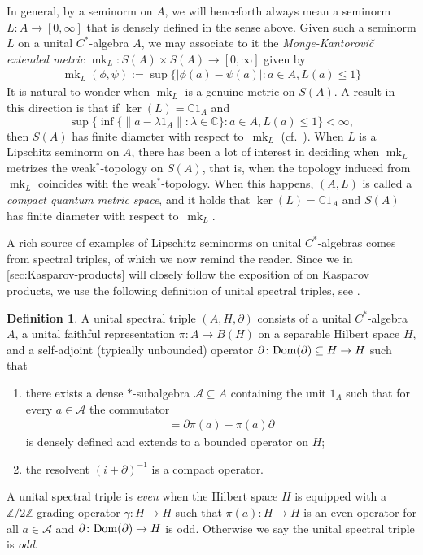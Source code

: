 \documentclass[11pt, a4paper, oneside, final, reqno]{amsart}
\newcommand{\calA}{\mathcal{A}}
\newcommand{\bbZ}{\mathbb{Z}}
\newcommand{\bbC}{\mathbb{C}}
\newcommand{\mk}{\operatorname{mk}}
\theoremstyle{definition}
\newtheorem{definition}{Definition}[section]
\theoremstyle{plain}
\theoremstyle{remark}
\numberwithin{equation}{section}
\begin{document}
In general, by a seminorm on $A$, we will henceforth always mean a seminorm $L \colon A \to [0, \infty]$ that is densely defined in the sense above. Given such a seminorm $L$ on a unital $C^*$-algebra $A$, we may associate to it the \emph{Monge-Kantorovi\v{c} extended metric} $\mk_L \colon S(A) \times S(A) \to [0,\infty]$ given by
\begin{align}\label{eq:def-mk-metric}
    \mk_L (\phi, \psi) := \sup \{ \vert \phi(a) - \psi(a) \vert : a\in A, L(a) \leq 1 \}
\end{align}
It is natural to wonder when $\mk_L$ is a genuine metric on $S(A)$. A result in this direction is that if $\ker(L) = \bbC 1_A$ and 
\begin{equation*}
    \sup\big\{\inf\{\|a-\lambda 1_A\|: \lambda \in \bbC\} : a\in A, L(a)\leq 1\big\} <\infty,
\end{equation*}
then $S(A)$ has finite diameter with respect to~$\mk_L$ (cf.~\cite[Proposition 1.6]{Rieffel98}). When $L$ is a Lipschitz seminorm on $A$, there has been a lot of interest in deciding when $\mk_L$ metrizes the weak$^*$-topology on $S(A)$, that is, when the topology induced from $\mk_L$ coincides with the weak$^*$-topology. When this happens, $(A, L)$ is called a \emph{compact quantum metric space}, and it holds that $\ker(L) = \bbC 1_A$ and $S(A)$ has finite diameter with respect to~$\mk_L$.

A rich source of examples of Lipschitz seminorms on unital $C^*$-algebras comes from spectral triples, of which we now remind the reader. Since we in \cref{sec:Kasparov-products} will  closely follow the exposition of \cite{Kaad24} on Kasparov products, we use the following definition of unital spectral triples, see \cite{Connes1989, ConnesNCGBook, Kaad24}.

\begin{definition}\label{def:spectral-triple}
    A unital spectral triple $(A,H,\partial)$ consists of a unital $C^*$-algebra $A$, a unital faithful representation $\pi\colon A \to B(H)$ on a separable Hilbert space $H$, and a self-adjoint (typically unbounded) operator $\partial \colon {\rm Dom}(\partial) \subseteq H \to H$ such that
    \begin{enumerate}
        \item[(a)] there exists a dense $*$-subalgebra $\calA \subseteq A$ 
        containing the unit $1_A$ 
        such that for every $a \in \calA$ the commutator
        \begin{align*}
            [\partial, \pi(a)] = \partial \pi(a) - \pi(a) \partial
        \end{align*}
        is densely defined and extends to a bounded operator on $H$;
        \item[(b)] the resolvent $(i +\partial)^{-1}$ is a compact operator.
    \end{enumerate}
    A unital spectral triple is \emph{even} when the Hilbert space $H$ is equipped with a $\bbZ /2\bbZ$-grading operator $\gamma \colon H \to H$ such that $\pi(a) \colon H\to H$ is an even operator for all $a \in \calA$ and $\partial \colon {\rm Dom}(\partial) \to H$ is odd. Otherwise we say the unital spectral triple is \emph{odd}.
\end{definition}
\end{document}
